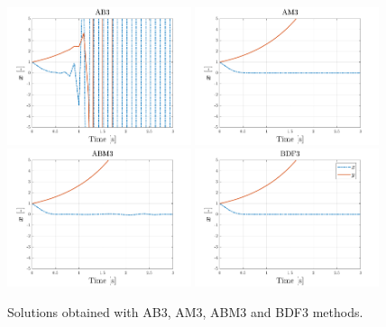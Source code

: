 \documentclass[11pt,a4paper,oneside]{article}
\begin{document}
\begin{figure}[h]
    \centering
    \includegraphics[width=0.48\textwidth]{gfx/ex7_1.pdf}
    \includegraphics[width=0.48\textwidth]{gfx/ex7_2.pdf}
    \includegraphics[width=0.48\textwidth]{gfx/ex7_3.pdf}
    \includegraphics[width=0.48\textwidth]{gfx/ex7_4.pdf}
    \caption{Solutions obtained with AB3, AM3, ABM3 and BDF3 methods.}
    \label{fig:ex7_1}
\end{figure}
\end{document}

